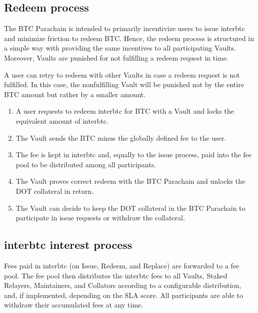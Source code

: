 \documentclass[a4paper,10pt,english]{sphinxmanual}
\begin{document}
\subsection{Redeem process}
\label{\detokenize{economics/incentives:redeem-process}}
The BTC Parachain is intended to primarily incentivize users to issue interbtc and minimize friction to redeem BTC. Hence, the redeem process is structured in a simple way with providing the same incentives to all participating Vaults. Moreover, Vaults are punished for not fulfilling a redeem request in time.

A user can retry to redeem with other Vaults in case a redeem request is not fulfilled. In this case, the non\sphinxhyphen{}fulfilling Vault will be punished not by the entire BTC amount but rather by a smaller amount.
\begin{enumerate}
%
\item {} 
A user requests to redeem interbtc for BTC with a Vault and locks the equivalent amount of interbtc.

\item {} 
The Vault sends the BTC minus the globally defined fee to the user.

\item {} 
The fee is kept in interbtc and, equally to the issue process, paid into the fee pool to be distributed among all participants.

\item {} 
The Vault proves correct redeem with the BTC Parachain and unlocks the DOT collateral in return.

\item {} 
The Vault can decide to keep the DOT collateral in the BTC Parachain to participate in issue requests or withdraw the collateral.

\end{enumerate}


\subsection{interbtc interest process}
\label{\detokenize{economics/incentives:interbtc-interest-process}}
Fees paid in interbtc (on Issue, Redeem, and Replace) are forwarded to a fee pool.
The fee pool then distributes the interbtc fees to all Vaults, Staked Relayers, Maintainers, and Collators according to a configurable distribution, and, if implemented, depending on the SLA score.
All participants are able to withdraw their accumulated fees at any time.
\end{document}

